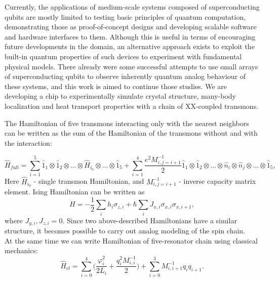 \documentclass[a0, portrait]{a0poster}
\begin{document}
\vspace{-1.5cm}
\begin{multicols}{2}	



\begin{tcolorbox}[left=1cm, right=1cm, top=0.5cm, bottom=0.5cm, 
                  title={\Large Introduction}, bottomtitle=.5cm,toptitle=.5cm]
\begingroup
\setlength{\columnsep}{1cm}
Currently, the applications of medium-scale systems composed of superconducting qubits are mostly limited to testing basic principles of quantum computation, demonstrating those as proof-of-concept designs and developing scalable software and hardware interfaces to them. Although this is useful in terms of encouraging future developments in the domain, an alternative approach exists to exploit the built-in quantum properties of such devices to experiment with fundamental physical models. There already were\cite{li2018perfect}\cite{macha2014implementation}\cite{roushan2017spectroscopic} some successful attempts to use small arrays of superconducting qubits to observe inherently quantum analog behaviour of these systems, and this work is aimed to continue those studies. We are developing a chip to experimentally simulate crystal structure, many-body localization and heat transport properties with a chain of XX-coupled transmons.
\endgroup
\end{tcolorbox}


\begin{tcolorbox}[left=1cm, right=1cm, top=0.5cm, bottom=0.5cm, 
                  title={\Large Study concept}, bottomtitle=.3cm,toptitle=.5cm
                  ]
		The Hamiltonian of five transmons interacting only with the nearest neighbors can be written as the sum of the Hamiltonian of the transmons without and with the interaction:               
		
		$$\hat{H}_{full} = \sum_{i=1}^5 \hat{1}_1 \otimes \hat{1}_2 \otimes...\otimes \hat{H}_{i_0} \otimes...\otimes \hat{1}_5 +  \sum_{i=1}^{4} \frac{e^2 M^{-1}_{i,j=i+1}}{2} \hat{1}_1 \otimes \hat{1}_2 \otimes...\otimes \hat{n}_{i} \otimes \hat{n}_{j} \otimes...\otimes \hat{1}_5,
		$$ 
		Here $\hat{H}_{i_0}$ - single transmon Hamiltonian, and $M^{-1}_{i,j=i+1}$ - inverse capacity matrix element.
		Ising Hamiltonian can be written as $$
		H = -\frac{1}{2}\sum_{i}h_i\sigma_{z,i}+\hbar\sum_{i}J_{x,i}\sigma_{x,i}\sigma_{x,i+1},
		$$ where $
		J_{y,i},J_{z,i}=0
		$. Since two above-described Hamiltonians have a similar structure, it becomes possible to carry out analog modeling of the spin chain.
		\\At the same time we can write Hamiltonian of five-resonator chain using classical mechanics: $$
		\hat{H}_{cl} = \sum_{i=0}^{4} \bigg(\frac{\varphi_i^2}{2L_i} + \frac{q_i^2 M^{-1}_{i,i}}{2} \bigg) + \sum_{i=0}^{3} M^{-1}_{i,i+1}q_i q_{i+1}.
		$$
		 

\end{tcolorbox}
\end{multicols}
\end{document}
